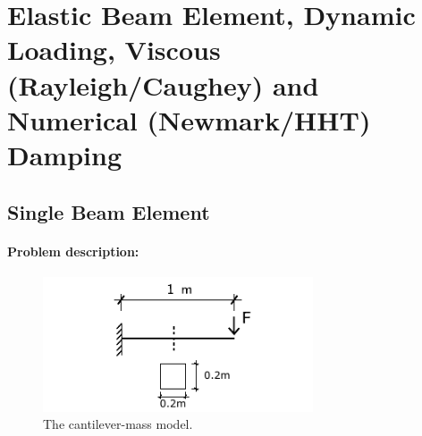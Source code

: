 \documentclass[fleqn,11pt]{article}
\begin{document}

\newpage
\section{Elastic   Beam  Element,  Dynamic  Loading,  Viscous    (Rayleigh/Caughey)  and
Numerical (Newmark/HHT) Damping}
\subsection{Single Beam Element} 
\paragraph{Problem description:} 

% 
% 
% 
% 
\begin{figure}[!htb]
  \centering
  \includegraphics[width=8cm]{../Figure-files/_Chapter_Appendix_Illustrative_Examples/cantilever.pdf}
  \caption{The cantilever-mass model.}
  \label{fig_cantilev_1beam_damping}
\end{figure}
\end{document}
